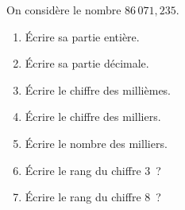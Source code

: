 \documentclass[exercice]{thedocument}%
\begin{document}
%
On considère le nombre $86\,071,235$.
\begin{enumerate}
    \item Écrire sa partie entière.
    \item Écrire sa partie décimale.
    \item Écrire le chiffre des millièmes.
    \item Écrire le chiffre des milliers.
    \item Écrire le nombre des milliers.
    \item Écrire le rang du chiffre $3$~?
    \item Écrire le rang du chiffre $8$~?
\end{enumerate}
\end{document}
